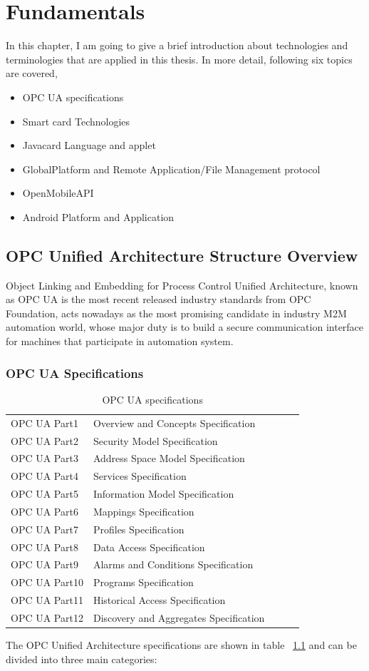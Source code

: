 \chapter{Fundamentals}

In this chapter, I am going to give a brief introduction about technologies and terminologies that are applied in this thesis. In more detail, following six topics are covered,
\begin{itemize}
\item OPC UA specifications
\item Smart card Technologies
\item Javacard Language and applet
\item GlobalPlatform  and Remote Application/File Management protocol
\item OpenMobileAPI
\item Android Platform and Application
\end{itemize}
\section{OPC Unified Architecture Structure Overview }
Object Linking and Embedding for Process Control Unified Architecture, known as OPC UA is the most recent released industry standards from OPC Foundation, acts nowadays as the most promising candidate in industry M2M automation world, whose major duty is to build a secure communication interface for machines that participate in automation system. 

\subsection{OPC UA Specifications}

\begin{table}[!htb]
\caption{OPC UA specifications}
\centering
\begin{tabular}{lllll}
\hline\hline
OPC UA Part1 &Overview and Concepts Specification \\
OPC UA Part2 &Security Model Specification \\
OPC UA Part3 &Address Space Model Specification\\
OPC UA Part4 &Services Specification\\
OPC UA Part5 &Information Model Specification  \\
OPC UA Part6 &Mappings Specification \\
OPC UA Part7 &Profiles Specification \\
OPC UA Part8 &Data Access Specification  \\
OPC UA Part9 &Alarms and Conditions Specification \\
OPC UA Part10 &Programs Specification  \\
OPC UA Part11 &Historical Access Specification \\
OPC UA Part12 &Discovery and Aggregates Specification \\
\hline
\end{tabular}
\label{table:opcua}
\end{table}
The OPC Unified Architecture specifications are shown in table ~\ref{table:opcua} and can be divided into three main categories:

